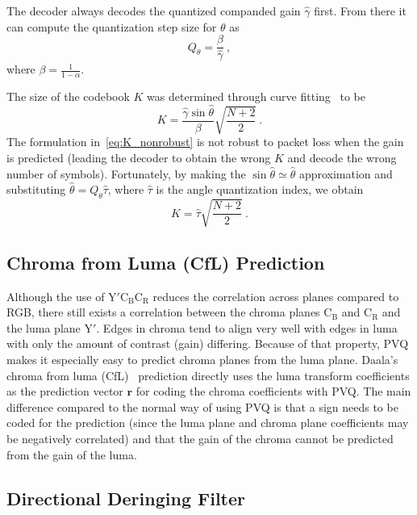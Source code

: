 \documentclass[english,conference,10pt]{IEEEtran}
\begin{document}
The decoder always decodes the quantized companded gain $\hat{\gamma}$
first. From there it can compute the quantization step size for $\theta$ as
\begin{equation}
Q_\theta = \frac{\beta}{\hat{\gamma}}\ ,
\end{equation}
where $\beta = \frac{1}{1-\alpha}$.

The size of the codebook $K$ was determined through curve
fitting~\cite{valin2015spie} to be
\begin{equation}
K = \frac{\hat{\gamma}\sin\hat{\theta}}{\beta}\sqrt{\frac{N+2}{2}}\ .
\label{eq:K_nonrobust}
\end{equation}
The formulation in~\cref{eq:K_nonrobust} is not robust to packet loss when
the gain is predicted (leading the decoder to obtain the wrong $K$ and decode
the wrong number of symbols). Fortunately, by making the $\sin{\hat{\theta}}
\simeq \hat{\theta}$ approximation and substituting $\hat{\theta} =
Q_\theta\hat{\tau}$, where $\hat{\tau}$ is the angle quantization index, we obtain
\begin{equation}
K = \hat{\tau} \sqrt{\frac{N+2}{2}}\ .
\end{equation}


\subsection{Chroma from Luma (CfL) Prediction}
\label{sec:CFL}
Although the use of $\mathrm{Y'C_BC_R}$ reduces the correlation across planes
compared to RGB, there still exists a correlation between the chroma planes
$\mathrm{C_B}$ and $\mathrm{C_R}$ and the luma plane $\mathrm{Y'}$. Edges in
chroma tend to
align very well with edges in luma with only the amount of contrast (gain) differing.
Because of that property, PVQ makes it especially easy to predict
chroma planes from the luma plane. Daala's chroma from luma (CfL)~\cite{egge2015spie}
prediction directly uses the luma transform coefficients as the prediction vector
$\mathbf{r}$ for coding the chroma coefficients with PVQ\@. The main difference compared
to the normal way of using PVQ is that a sign needs to be coded for the prediction
(since the luma plane and chroma plane coefficients may be negatively correlated) and
that the gain of the chroma cannot be predicted from the gain of the luma.


\subsection{Directional Deringing Filter}
\label{sec:deringing}
\end{document}
